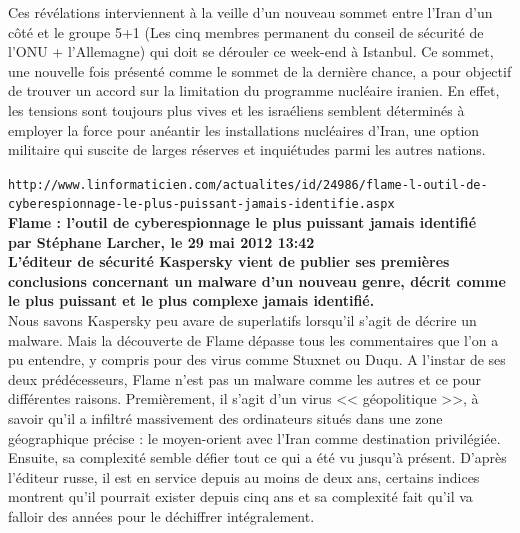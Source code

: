 \documentclass[11pt,twoside,a4paper]{article}
\begin{document}
Ces r{\'e}v{\'e}lations interviennent {\`a} la veille d'un nouveau sommet entre l'Iran d'un c{\^o}t{\'e} et le groupe 5+1 (Les cinq membres permanent du conseil de s{\'e}curit{\'e} de l'ONU + l'Allemagne) qui doit se d{\'e}rouler ce week-end {\`a} Istanbul. Ce sommet, une nouvelle fois pr{\'e}sent{\'e} comme le sommet de la derni{\`e}re chance, a pour objectif de trouver un accord sur la limitation du programme nucl{\'e}aire iranien. En effet, les tensions sont toujours plus vives et les isra{\'e}liens semblent d{\'e}termin{\'e}s {\`a} employer la force pour an{\'e}antir les installations nucl{\'e}aires d'Iran, une option militaire qui suscite de larges r{\'e}serves et inqui{\'e}tudes parmi les autres nations.~\\

\clearpage

\texttt{http://www.linformaticien.com/actualites/id/24986/flame-l-outil-de-cyberespionnage-le-plus-puissant-jamais-identifie.aspx}~\\

\textbf{\LARGE Flame : l'outil de cyberespionnage le plus puissant jamais identifi{\'e}}~\\

\textbf{\small par St{\'e}phane Larcher, le 29 mai 2012 13:42}~\\

\textbf{L'{\'e}diteur de s{\'e}curit{\'e} Kaspersky vient de publier ses premi{\`e}res conclusions concernant un malware d'un nouveau genre, d{\'e}crit comme le plus puissant et le plus complexe jamais identifi{\'e}. }~\\

Nous savons Kaspersky peu avare de superlatifs lorsqu'il s'agit de d{\'e}crire un malware. Mais la d{\'e}couverte de Flame d{\'e}passe tous les commentaires que l'on a pu entendre, y compris pour des virus comme Stuxnet ou Duqu. A l'instar de ses deux pr{\'e}d{\'e}cesseurs, Flame n'est pas un malware comme les autres et ce pour diff{\'e}rentes raisons. Premi{\`e}rement, il s'agit d'un virus << g{\'e}opolitique >>, {\`a} savoir qu'il a infiltr{\'e} massivement des ordinateurs situ{\'e}s dans une zone g{\'e}ographique pr{\'e}cise : le moyen-orient avec l'Iran comme destination privil{\'e}gi{\'e}e. Ensuite, sa complexit{\'e} semble d{\'e}fier tout ce qui a {\'e}t{\'e} vu jusqu'{\`a} pr{\'e}sent. D'apr{\`e}s l'{\'e}diteur russe, il est en service depuis au moins de deux ans, certains indices montrent qu'il pourrait exister depuis cinq ans et sa complexit{\'e} fait qu'il va falloir des ann{\'e}es pour le d{\'e}chiffrer int{\'e}gralement.~\\
\end{document}

